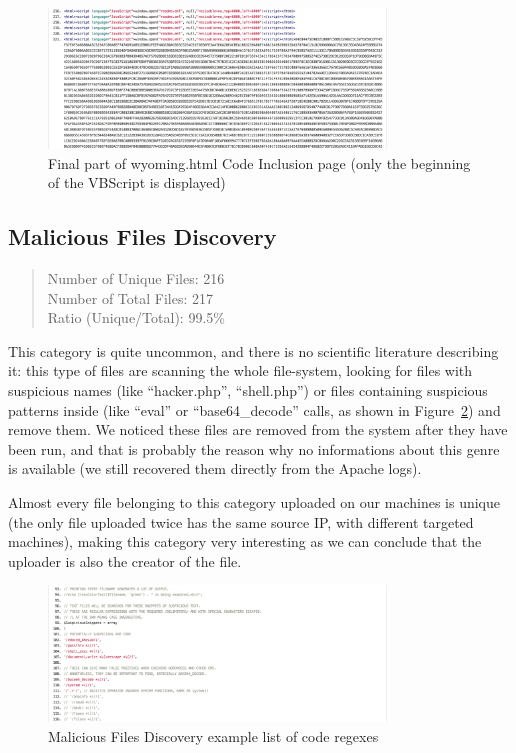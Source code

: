  \begin{figure}[H]
\centerline{\includegraphics[width=0.8\textwidth]{Images/codeInclusion.jpg}}
\caption{Final part of wyoming.html Code Inclusion page (only the beginning of the VBScript is displayed)\label{fig:codeInclusion}}
\end{figure}

\subsection{Malicious Files Discovery}

\begin{quote}
Number of Unique Files: 216\\
Number of Total Files: 217\\
Ratio (Unique/Total): 99.5\%
\end{quote}

This category is quite uncommon, and there is no scientific literature describing it: this type of files are scanning the whole file-system, looking for files with suspicious names (like ``hacker.php'', ``shell.php'') or files containing suspicious patterns inside (like ``eval'' or ``base64\_decode'' calls, as shown in Figure~\ref{fig:maliciousFilesDiscovery}) and remove them. We noticed these files are removed from the system after they have been run, and that is probably the reason why no informations about this genre is available (we still recovered them directly from the Apache logs).

Almost every file belonging to this category uploaded on our machines is unique (the only file uploaded twice has the same source IP, with different targeted machines), making this category very interesting as we can conclude that the uploader is also the creator of the file.

 \begin{figure}[H]
\centerline{\includegraphics[width=0.8\textwidth]{Images/maliciousFilesDiscovery.jpg}}
\caption{Malicious Files Discovery example list of code regexes\label{fig:maliciousFilesDiscovery}}
\end{figure}

